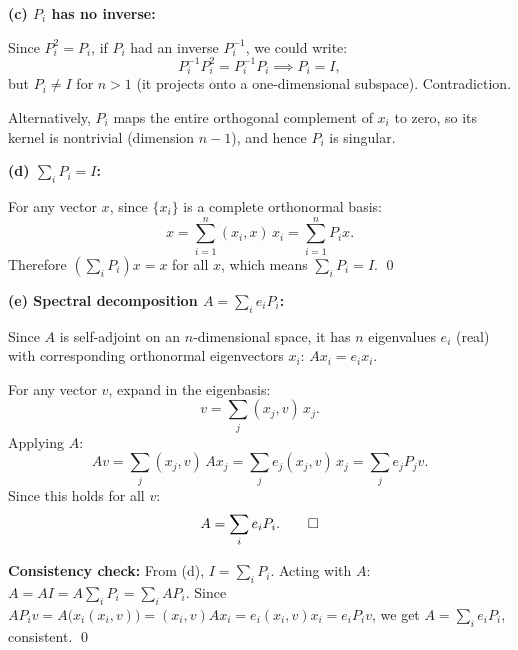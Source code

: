 \documentclass[12pt]{article}
\begin{document}
\bigskip
\textbf{(c) $P_i$ has no inverse:}

Since $P_i^2 = P_i$, if $P_i$ had an inverse $P_i^{-1}$, we could write:
\[
P_i^{-1}P_i^2 = P_i^{-1}P_i \implies P_i = I,
\]
but $P_i \neq I$ for $n > 1$ (it projects onto a one-dimensional subspace). Contradiction.

Alternatively, $P_i$ maps the entire orthogonal complement of $x_i$ to zero, so its kernel is nontrivial (dimension $n-1$), and hence $P_i$ is singular.

\bigskip
\textbf{(d) $\sum_i P_i = I$:}

For any vector $x$, since $\{x_i\}$ is a complete orthonormal basis:
\[
x = \sum_{i=1}^n (x_i, x)\,x_i = \sum_{i=1}^n P_i x.
\]
Therefore $\left(\sum_i P_i\right)x = x$ for all $x$, which means $\sum_i P_i = I$. \qed

\bigskip
\textbf{(e) Spectral decomposition $A = \sum_i e_i P_i$:}

Since $A$ is self-adjoint on an $n$-dimensional space, it has $n$ eigenvalues $e_i$ (real) with corresponding orthonormal eigenvectors $x_i$: $Ax_i = e_i x_i$.

For any vector $v$, expand in the eigenbasis:
\[
v = \sum_j (x_j, v)\,x_j.
\]
Applying $A$:
\[
Av = \sum_j (x_j, v)\,Ax_j = \sum_j e_j(x_j, v)\,x_j = \sum_j e_j P_j v.
\]
Since this holds for all $v$:
\[
A = \sum_i e_i P_i. \qed
\]

\textbf{Consistency check:} From (d), $I = \sum_i P_i$. Acting with $A$: $A = AI = A\sum_i P_i = \sum_i AP_i$. Since $AP_i v = A\bigl(x_i(x_i,v)\bigr) = (x_i,v)Ax_i = e_i(x_i,v)x_i = e_i P_i v$, we get $A = \sum_i e_i P_i$, consistent. \qed
\end{document}
